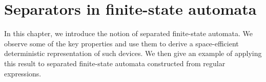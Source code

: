 \chapter{Separators in finite-state automata}
\label{chapter:separators_finite_state_automata}

In this chapter, we introduce the notion of separated finite-state automata. We
observe some of the key properties and use them to derive a space-efficient
deterministic representation of such devices. We then give an example of applying
this result to separated finite-state automata constructed from regular expressions.








